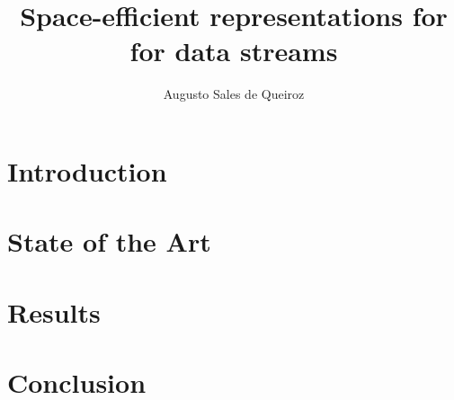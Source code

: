 \documentclass[bsc,en]{ufpethesis}
\institute{Centro de Informatica}
\author{Augusto Sales de Queiroz}
\title{Space-efficient representations for \dBG for data streams}
\begin{document}
\frontmatter
    \frontpage
    \presentationpage

    \mainmatter
    \chapter{Introduction}
    \chapter{State of the Art}
    
    \chapter{Results}
    \chapter{Conclusion}

    \backmatter
    
    
\end{document}
